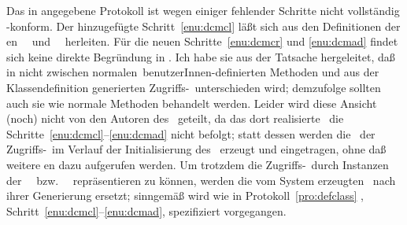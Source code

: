 %
Das in \cite[]{bib:pa91b} angegebene Protokoll ist wegen
einiger fehlender Schritte nicht voll\-st\"{a}n\-dig \mop-konform.
Der hinzugef\"{u}gte Schritt~\ref{enu:dcmcl} l\"{a}\ss{}t sich
aus den Definitionen der
\gfn[n]en \ \ und
\ \ herleiten.
F\"{u}r die neuen Schritte~\ref{enu:dcmcr} und \ref{enu:dcmad} findet
sich keine direkte Begr\"{u}ndung in \cite{bib:amop91}. Ich habe sie aus
der Tatsache hergeleitet, da\ss{} in \cite{bib:amop91} nicht zwischen
\rglq{}normalen\rgrq\ be\-nut\-zer\-In\-nen-de\-fi\-nier\-ten Methoden
und aus der Klassendefinition generierten
Zugriffs-\mtd[n]\ unterschieden wird; demzufolge sollten auch sie wie
normale Methoden behandelt werden. Leider wird diese Ansicht (noch)
nicht von den Autoren des \lwcl\ geteilt, da das dort realisierte
\mop\ die Schritte~\ref{enu:dcmcl}--\ref{enu:dcmad} nicht befolgt;
statt dessen werden die \mtdmo[e]\ der Zugriffs-\mtd[n]\ im
Verlauf der Initialisierung des \clsmo[es]\ erzeugt und
eingetragen, ohne da\ss{} weitere \gfn{}en dazu aufgerufen
werden. Um trotzdem die Zugriffs-\mtd[n]\ durch Instanzen
der \mtdmc[n]\ \ bzw.\ %
\ repr\"{a}sentieren zu k\"{o}n\-nen, werden
die vom System erzeugten \mtdmo[e]\ nach ihrer Generierung ersetzt;
sinngem\"{a}\ss{} wird wie in Protokoll~\ref{pro:defclass}
, Schritt~\ref{enu:dcmcl}--\ref{enu:dcmad},
spezifiziert vorgegangen.
%
